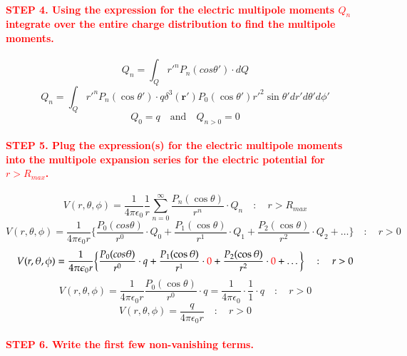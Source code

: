 \documentclass{article}
\begin{document}
\paragraph{\textcolor{red}{STEP 4. Using the expression for the electric multipole moments $Q_n$ integrate over the entire charge distribution to find the multipole moments.}}
\begin{equation*}
    Q_n=\int_Q r'^nP_n(cos\theta')\cdot dQ
\end{equation*}
\begin{equation*}
    Q_n=\int_Q r'^nP_n(\cos \theta')\cdot q\delta^3(\boldsymbol{r}')P_0(\cos\theta')r'^2\sin\theta'dr'd\theta'd\phi'
\end{equation*}
\begin{equation*}
    Q_0=q\quad \text{and}\quad Q_{n>0}=0
\end{equation*}
\paragraph{\textcolor{red}{STEP 5. Plug the expression(s) for the electric multipole moments into the multipole expansion series for the electric potential for $r>R_{max}$.}}
\begin{equation*}
    V(r,\theta,\phi)=\frac{1}{4\pi\epsilon_0}\frac{1}{r}\sum_{n=0}^{\infty}\frac{P_n(\cos\theta)}{r^n}\cdot Q_n\quad : \quad r>R_{max}
\end{equation*}
\begin{equation*}
    V(r,\theta,\phi)=\frac{1}{4\pi\epsilon_0r}\bigg\{ \frac{P_0(cos\theta)}{r^0}\cdot Q_0+\frac{P_1(\cos\theta)}{r^1}\cdot Q_1+\frac{P_2(\cos\theta)}{r^2}\cdot Q_2+\dots\bigg\}\quad : \quad r>0
\end{equation*}
\begin{equation*}
    V(r,\theta,\phi)=\frac{1}{4\pi\epsilon_0r}\bigg\{ \frac{P_0(cos\theta)}{r^0}\cdot q+\frac{P_1(\cos\theta)}{r^1}\cdot \textcolor{red}{0}+\frac{P_2(\cos\theta)}{r^2}\cdot \textcolor{red}{0}+\dots\bigg\}\quad : \quad r>0
\end{equation*}
\begin{equation*}
    V(r,\theta,\phi)=\frac{1}{4\pi\epsilon_0r}\frac{P_0(\cos\theta)}{r^0}\cdot q=\frac{1}{4\pi\epsilon_0}\cdot \frac{1}{1}\cdot q\quad :\quad r>0
\end{equation*}
\begin{equation*}
    V(r,\theta, \phi)=\frac{q}{4\pi\epsilon_0r}\quad:\quad r>0
\end{equation*}
\paragraph{\textcolor{red}{STEP 6. Write the first few non-vanishing terms.}}
\end{document}
